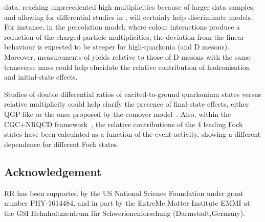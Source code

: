\documentclass[../report.tex]{subfiles}
\begin{document}
\RunsThreeFour data, reaching unprecedented high multiplicities because of larger data samples, and allowing for differential studies in \pT, will certainly help discriminate models.
For instance, in the percolation model, where colour interactions produce a reduction of the charged-particle multiplicities, the deviation from the linear behaviour is expected to be steeper for high-\pT quarkonia (and D mesons).
Moreover, measurements of \PJgy  yields relative to those of D mesons with the same transverse mass could help elucidate the relative contribution of hadronisation and initial-state effects.

Studies of double differential ratios of excited-to-ground quarkonium states versus relative multiplicity could help clarify the presence of final-state effects, either QGP-like or the ones proposed by the comover model~\cite{Ferreiro:2014bia,Ferreiro:2018wbd}.
Also, within the CGC+NRQCD framework~\cite{Ma:2018bax}, the relative contributions of the 4 leading \PJgy Fock states have been calculated as a function of the event activity, showing a different dependence for different Fock states.


\subsection*{Acknowledgement}
RR has been supported by the US National Science Foundation under
grant number PHY-1614484, and in part by the ExtreMe Matter Institute EMMI at 
the GSI Helmholtzzentrum f\"{u}r Schwerionenforschung (Darmstadt,Germany).
\end{document}
